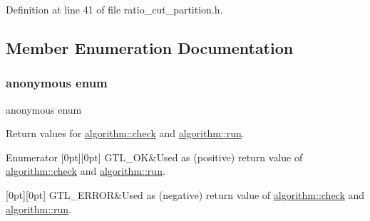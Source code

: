 Definition at line 41 of file ratio\+\_\+cut\+\_\+partition.\+h.



\subsection{Member Enumeration Documentation}
\mbox{\label{classalgorithm_af1a0078e153aa99c24f9bdf0d97f6710}} 
\subsubsection{\texorpdfstring{anonymous enum}{anonymous enum}}
{\footnotesize\ttfamily anonymous enum\hspace{0.3cm}{\ttfamily [inherited]}}



Return values for \mbox{\hyperlink{classalgorithm_a76361fb03ad1cf643affc51821e43bed}{algorithm\+::check}} and \mbox{\hyperlink{classalgorithm_a734b189509a8d6b56b65f8ff772d43ca}{algorithm\+::run}}. 

\begin{DoxyEnumFields}{Enumerator}
[0pt][0pt]{}\mbox{\label{classalgorithm_af1a0078e153aa99c24f9bdf0d97f6710a5114c20e4a96a76b5de9f28bf15e282b}} 
G\+T\+L\+\_\+\+OK&Used as (positive) return value of \mbox{\hyperlink{classalgorithm_a76361fb03ad1cf643affc51821e43bed}{algorithm\+::check}} and \mbox{\hyperlink{classalgorithm_a734b189509a8d6b56b65f8ff772d43ca}{algorithm\+::run}}. \\
\hline

[0pt][0pt]{}\mbox{\label{classalgorithm_af1a0078e153aa99c24f9bdf0d97f6710a6fcf574690bbd6cf710837a169510dd7}} 
G\+T\+L\+\_\+\+E\+R\+R\+OR&Used as (negative) return value of \mbox{\hyperlink{classalgorithm_a76361fb03ad1cf643affc51821e43bed}{algorithm\+::check}} and \mbox{\hyperlink{classalgorithm_a734b189509a8d6b56b65f8ff772d43ca}{algorithm\+::run}}. \\
\hline

\end{DoxyEnumFields}


